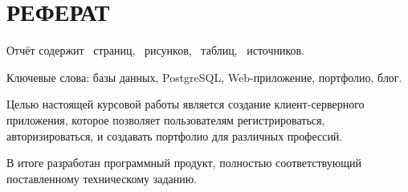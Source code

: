 \chapter*{\hfill{}РЕФЕРАТ\hfill{}}%
\label{cha:referat}

Отчёт содержит~\pageref{LastPage} страниц, ~рисунков, ~таблиц, ~источников.

\sloppy Ключевые слова: базы данных, PostgreSQL, Web-приложение, портфолио, блог.

\sloppy Целью настоящей курсовой работы является создание клиент-серверного приложения, которое позволяет пользователям регистрироваться, авторизироваться, и создавать портфолио для различных профессий.

\sloppy В итоге разработан программный продукт, полностью соответствующий поставленному техническому заданию.
